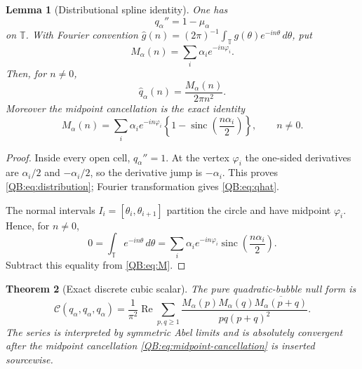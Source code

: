 \documentclass[11pt]{amsart}
\numberwithin{equation}{section}
\newtheorem{theorem}{Theorem}[section]
\newtheorem{lemma}[theorem]{Lemma}
\theoremstyle{definition}
\theoremstyle{remark}
\newcommand{\T}{\mathbb T}
\newcommand{\Cnull}{\mathcal C}
\begin{document}
\begin{lemma}[Distributional spline identity]
\label{QB:lem:distribution}
One has
\begin{equation}\label{QB:eq:distribution}
 q_\alpha''=1-\mu_\alpha
\end{equation}
on $\T$.  With Fourier convention
$\widehat g(n)=(2\pi)^{-1}\int_\T g(\theta)e^{-in\theta}\,d\theta$, put
\begin{equation}\label{QB:eq:M}
 M_\alpha(n)=\sum_i\alpha_i e^{-in\varphi_i}.
\end{equation}
Then, for $n\ne0$,
\begin{equation}\label{QB:eq:qhat}
 \widehat q_\alpha(n)=\frac{M_\alpha(n)}{2\pi n^2}.
\end{equation}
Moreover the midpoint cancellation is the exact identity
\begin{equation}\label{QB:eq:midpoint-cancellation}
 M_\alpha(n)=\sum_i\alpha_i e^{-in\varphi_i}
 \left\{1-\operatorname{sinc}\left(\frac{n\alpha_i}{2}\right)\right\},
 \qquad n\ne0.
\end{equation}
\end{lemma}

\begin{proof}
Inside every open cell, $q_\alpha''=1$.  At the vertex $\varphi_i$ the
one-sided derivatives are $\alpha_i/2$ and $-\alpha_i/2$, so the derivative
jump is $-\alpha_i$.  This proves \eqref{QB:eq:distribution}; Fourier
transformation gives \eqref{QB:eq:qhat}.

The normal intervals
$I_i=[\theta_i,\theta_{i+1}]$ partition the circle and have midpoint
$\varphi_i$.  Hence, for $n\ne0$,
\begin{equation*}
 0=\int_\T e^{-in\theta}\,d\theta
 =\sum_i\alpha_i e^{-in\varphi_i}
 \operatorname{sinc}\left(\frac{n\alpha_i}{2}\right).
\end{equation*}
Subtract this equality from \eqref{QB:eq:M}.
\end{proof}

\begin{theorem}[Exact discrete cubic scalar]
\label{QB:thm:discrete}
The pure quadratic-bubble null form is
\begin{equation}\label{QB:eq:discrete}
 \boxed{
 \Cnull(q_\alpha,q_\alpha,q_\alpha)
 =\frac1{\pi^2}\operatorname{Re}
 \sum_{p,q\ge1}
 \frac{M_\alpha(p)M_\alpha(q)
 \overline{M_\alpha(p+q)}}{pq(p+q)^2}.}
\end{equation}
The series is interpreted by symmetric Abel limits and is absolutely
convergent after the midpoint cancellation \eqref{QB:eq:midpoint-cancellation}
is inserted sourcewise.
\end{theorem}
\end{document}
